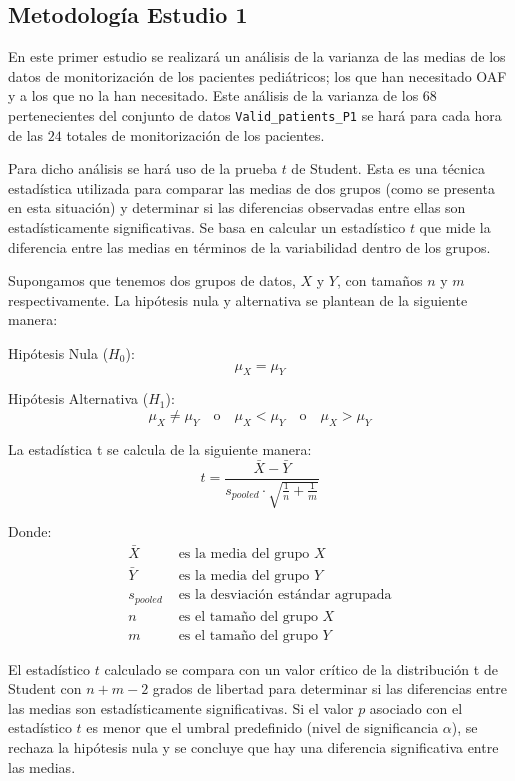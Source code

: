 \subsection{Metodología Estudio 1}\label{sec:metodologia-estudio-1}

En este primer estudio se realizará un análisis de la varianza de las medias de los datos de monitorización de los pacientes pediátricos; los que han necesitado OAF y a los que no la han necesitado. Este análisis de la varianza de los $68$ pertenecientes del conjunto de datos \texttt{Valid\_patients\_P1} se hará para cada hora de las $24$ totales de monitorización de los pacientes.

Para dicho análisis se hará uso de la prueba $t$ de Student. Esta es una técnica estadística utilizada para comparar las medias de dos grupos (como se presenta en esta situación) y determinar si las diferencias observadas entre ellas son estadísticamente significativas. Se basa en calcular un estadístico $t$ que mide la diferencia entre las medias en términos de la variabilidad dentro de los grupos.

Supongamos que tenemos dos grupos de datos, $X$ y $Y$, con tamaños $n$ y $m$ respectivamente. La hipótesis nula y alternativa se plantean de la siguiente manera:

Hipótesis Nula ($H_0$):
\[
\mu_X = \mu_Y
\]

Hipótesis Alternativa ($H_1$):
\[
\mu_X \neq \mu_Y \quad \text{o} \quad \mu_X < \mu_Y \quad \text{o} \quad \mu_X > \mu_Y
\]

La estadística t se calcula de la siguiente manera:
\[
t = \frac{\bar{X} - \bar{Y}}{s_{pooled} \cdot \sqrt{\frac{1}{n} + \frac{1}{m}}}
\]

Donde:
\begin{align*}
\bar{X} & \text{ es la media del grupo } X \\
\bar{Y} & \text{ es la media del grupo } Y \\
s_{pooled} & \text{ es la desviación estándar agrupada} \\
n & \text{ es el tamaño del grupo } X \\
m & \text{ es el tamaño del grupo } Y
\end{align*}

El estadístico $t$ calculado se compara con un valor crítico de la distribución t de Student con $n+m-2$ grados de libertad para determinar si las diferencias entre las medias son estadísticamente significativas. Si el valor $p$ asociado con el estadístico $t$ es menor que el umbral predefinido (nivel de significancia $\alpha$), se rechaza la hipótesis nula y se concluye que hay una diferencia significativa entre las medias.

